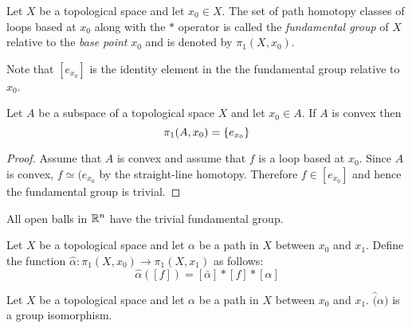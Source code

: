 \documentclass[letterpaper,12pt,fleqn]{article}
\renewcommand{\a}{\alpha}
\begin{document}
\begin{definition}
  Let \(X\) be a topological space and let \(x_0\in X\).  The set of path homotopy classes of loops based at
  \(x_0\) along with the \(*\) operator is called the \emph{fundamental group} of \(X\) relative to the
  \emph{base point} \(x_0\) and is denoted by \(\pi_1(X,x_0)\).
\end{definition}

Note that \([e_{x_0}]\) is the identity element in the the fundamental group relative to \(x_0\).

\begin{theorem}
  Let \(A\) be a subspace of a topological space \(X\) and let \(x_0\in A\).  If \(A\) is convex then
  \[\pi_1(A,x_0)=\{e_{x_0}\}\]
\end{theorem}

\begin{proof}
  Assume that \(A\) is convex and assume that \(f\) is a loop based at \(x_0\).  Since \(A\) is convex,
  \(f\simeq (e_{x_0}\) by the straight-line homotopy.  Therefore \(f\in[e_{x_0}]\) and hence the fundamental
  group is trivial.
\end{proof}

\begin{corollary}
  All open balls in \(\mathbb{R}^n\) have the trivial fundamental group.
\end{corollary}

\begin{definition}
  Let \(X\) be a topological space and let \(\a\) be a path in \(X\) between \(x_0\) and \(x_1\).  Define the
  function \(\hat{\a}:\pi_1(X,x_0)\to\pi_1(X,x_1)\) as follows:
  \[\hat{\a}([f])=[\bar{\a}]*[f]*[\a]\]
\end{definition}

\begin{theorem}
  Let \(X\) be a topological space and let \(\a\) be a path in \(X\) between \(x_0\) and \(x_1\).  \(\hat(\a)\)
  is a group isomorphism.
\end{theorem}
\end{document}
